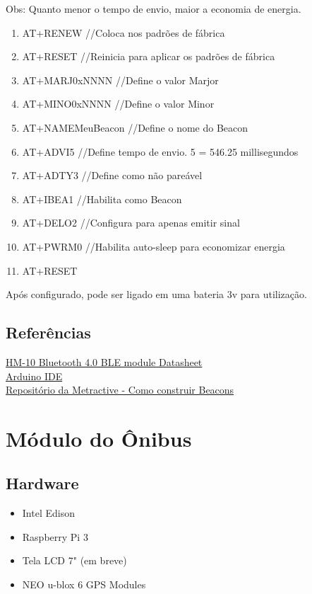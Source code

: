 \documentclass[
	12pt,				%
	oneside,			%
	a4paper,			%
	brazil				%
]{abntex2}
\begin{document}
Obs: Quanto menor o tempo de envio, maior a economia de energia.

\begin{enumerate}
\item AT+RENEW //Coloca nos padrões de fábrica
\item AT+RESET //Reinicia para aplicar os padrões de fábrica
\item AT+MARJ0xNNNN //Define o valor Marjor
\item AT+MINO0xNNNN //Define o valor Minor
\item AT+NAMEMeuBeacon //Define o nome do Beacon
\item AT+ADVI5 //Define tempo de envio. 5 = 546.25 millisegundos
\item AT+ADTY3 //Define como não pareável
\item AT+IBEA1 //Habilita como Beacon
\item AT+DELO2 //Configura para apenas emitir sinal
\item AT+PWRM0 //Habilita auto-sleep para economizar energia
\item AT+RESET
\end{enumerate}


Após configurado, pode ser ligado em uma bateria 3v para utilização.

\subsection{Referências}

\href{ftp://imall.iteadstudio.com/Modules/IM130614001_Serial_Port_BLE_Module_Master_Slave_HM-10/DS_IM130614001_Serial_Port_BLE_Module_Master_Slave_HM-10.pdf}{HM-10 Bluetooth 4.0 BLE module Datasheet}
\\
\href{https://www.arduino.cc/en/main/software}{Arduino IDE}
\\
\href{https://github.com/metractive/beacon-study}{Repositório da Metractive - Como construir Beacons}

\section{Módulo do Ônibus}

\subsection{Hardware}

\begin{itemize}
\item Intel Edison
\item Raspberry Pi 3
\item Tela LCD 7" (em breve)
\item NEO u-blox 6 GPS Modules
\end{itemize}
\end{document}

